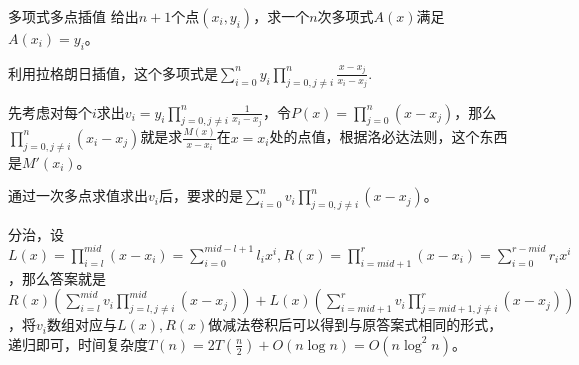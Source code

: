 \documentclass{beamer}
\begin{document}
	\begin{frame}{多项式多点插值}
		给出$n+1$个点$(x_i,y_i)$，求一个$n$次多项式$A(x)$满足$A(x_i)=y_i$。
		
		利用拉格朗日插值，这个多项式是$\sum_{i=0}^ny_i\prod_{j=0,j\neq i}^n\frac{x-x_j}{x_i-x_j}$.
		
		先考虑对每个$i$求出$v_i=y_i\prod_{j=0,j\neq i}^n\frac{1}{x_i-x_j}$，令$P(x)=\prod_{j=0}^n(x-x_j)$，那么$\prod_{j=0,j\neq i}^n(x_i-x_j)$就是求$\frac{M(x)}{x-x_i}$在$x=x_i$处的点值，根据洛必达法则，这个东西是$M'(x_i)$。
		
		通过一次多点求值求出$v_i$后，要求的是$\sum_{i=0}^nv_i\prod_{j=0,j\neq i}^n(x-x_j)$。
		
		分治，设$L(x)=\prod_{i=l}^{mid}(x-x_i)=\sum_{i=0}^{mid-l+1}l_ix^i,R(x)=\prod_{i=mid+1}^{r}(x-x_i)=\sum_{i=0}^{r-mid}r_ix^i$，那么答案就是$R(x)(\sum_{i=l}^{mid}v_i\prod_{j=l,j\neq i}^{mid}(x-x_j))+L(x)(\sum_{i=mid+1}^rv_i\prod_{j=mid+1,j\neq i}^r(x-x_j))$，将$v_i$数组对应与$L(x),R(x)$做减法卷积后可以得到与原答案式相同的形式，递归即可，时间复杂度$T(n)=2T(\frac n2)+O(n\log n)=O(n\log^2n)$。
	\end{frame}
\end{document}
